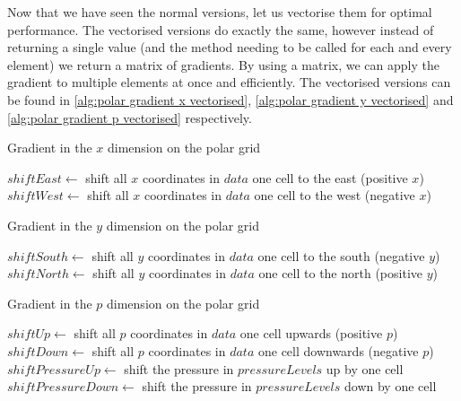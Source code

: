 Now that we have seen the normal versions, let us vectorise them for optimal performance. The vectorised versions do exactly the same, however instead of returning a single value (and the method
needing to be called for each and every element) we return a matrix of gradients. By using a matrix, we can apply the gradient to multiple elements at once and efficiently. The vectorised 
versions can be found in \autoref{alg:polar gradient x vectorised}, \autoref{alg:polar gradient y vectorised} and \autoref{alg:polar gradient p vectorised} respectively.

\begin{algorithm}[htb]
    \caption{Gradient in the $x$ dimension on the polar grid}
    \label{alg:polar gradient x vectorised}
    $shiftEast \leftarrow $ shift all $x$ coordinates in $data$ one cell to the east (positive $x$) \;
    $shiftWest \leftarrow $ shift all $x$ coordinates in $data$ one cell to the west (negative $x$) \;
\end{algorithm}

\begin{algorithm}[htb]
    \caption{Gradient in the $y$ dimension on the polar grid}
    \label{alg:polar gradient y vectorised}
    $shiftSouth \leftarrow $ shift all $y$ coordinates in $data$ one cell to the south (negative $y$) \;
    $shiftNorth \leftarrow $ shift all $y$ coordinates in $data$ one cell to the north (positive $y$) \;
\end{algorithm}

\begin{algorithm}[htb]
    \caption{Gradient in the $p$ dimension on the polar grid}
    \label{alg:polar gradient p vectorised}
    $shiftUp\leftarrow $ shift all $p$ coordinates in $data$ one cell upwards (positive $p$) \;
    $shiftDown \leftarrow $ shift all $p$ coordinates in $data$ one cell downwards (negative $p$) \;
    $shiftPressureUp \leftarrow$ shift the pressure in $pressureLevels$ up by one cell \;
    $shiftPressureDown \leftarrow$ shift the pressure in $pressureLevels$ down by one cell \;
\end{algorithm}

